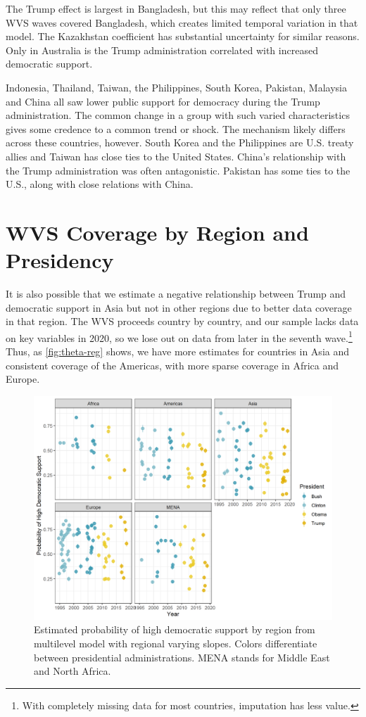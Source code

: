 \documentclass[12pt]{article}
\begin{document}
The Trump effect is largest in Bangladesh, but this may reflect that only three WVS waves covered Bangladesh, which creates limited temporal variation in that model. 
The Kazakhstan coefficient has substantial uncertainty for similar reasons. 
Only in Australia is the Trump administration correlated with increased democratic support. 


Indonesia, Thailand, Taiwan, the Philippines, South Korea, Pakistan, Malaysia and China all saw lower public support for democracy during the Trump administration. 
The common change in a group with such varied characteristics gives some credence to a common trend or shock. 
The mechanism likely differs across these countries, however. 
South Korea and the Philippines are U.S. treaty allies and Taiwan has close ties to the United States. 
China's relationship with the Trump administration was often antagonistic. 
Pakistan has some ties to the U.S., along with close relations with China. 


\newpage


\section{WVS Coverage by Region and Presidency}


It is also possible that we estimate a negative relationship between Trump and democratic support in Asia but not in other regions due to better data coverage in that region. 
The WVS proceeds country by country, and our sample lacks data on key variables in 2020, so we lose out on data from later in the seventh wave.\footnote{With completely missing data for most countries, imputation has less value.}
Thus, as \autoref{fig:theta-reg} shows, we have more estimates for countries in Asia and consistent coverage of the Americas, with more sparse coverage in Africa and Europe. 



\begin{figure}
\includegraphics[width = .95\textwidth]{theta-reg.png}
\caption{Estimated probability of high democratic support by region from multilevel model with regional varying slopes. Colors differentiate between presidential administrations. MENA stands for Middle East and North Africa.}
\label{fig:theta-reg} 
\end{figure}
\end{document}
